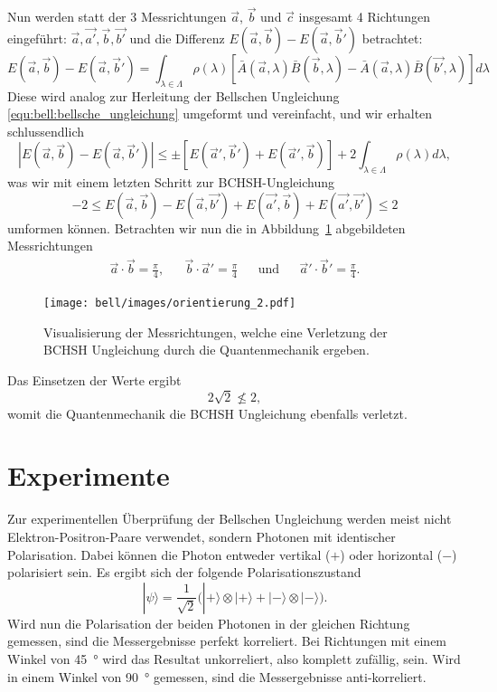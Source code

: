 \begin{refsection}
Nun werden statt der 3 Messrichtungen $\vec{a}$, $\vec{b}$ und $\vec{c}$
insgesamt 4 Richtungen eingef\"uhrt: $\vec{a}, \vec{a'}, \vec{b}, \vec{b'}$
und die Differenz $E(\vec{a},\vec{b}) - E(\vec{a},\vec{b}')$ betrachtet:
\begin{equation}
    E(\vec{a},\vec{b}) - E(\vec{a},\vec{b}') = 
    \int_{\lambda\in\Lambda} \rho(\lambda) \left[
        \bar{A}(\vec{a},\lambda)\bar{B}(\vec{b},\lambda) -
        \bar{A}(\vec{a},\lambda)\bar{B}(\vec{b'},\lambda)
    \right] d\lambda
\end{equation}
Diese wird analog zur Herleitung der Bellschen Ungleichung 
\eqref{equ:bell:bellsche_ungleichung} umgeformt und vereinfacht, und wir
erhalten schlussendlich
\[
    \left| E(\vec{a},\vec{b}) - E(\vec{a},\vec{b}') \right| \leq \pm \left[
        E(\vec{a}',\vec{b}') + E(\vec{a}',\vec{b})
    \right]
    + 2 \int_{\lambda\in\Lambda} \rho(\lambda) d\lambda,
\]
was wir mit einem letzten Schritt zur BCHSH-Ungleichung
\begin{equation}\label{equ:bell:bchsh-ungleichung}
    -2 \leq 
    E(\vec{a},\vec{b}) - E(\vec{a},\vec{b'}) + E(\vec{a'},\vec{b}) + E(\vec{a'},\vec{b'})
    \leq 2
\end{equation}
umformen k\"onnen.
Betrachten wir nun die in Abbildung~\ref{fig:bell:orientierung_2}
abgebildeten Messrichtungen
\begin{align*}
    \vec{a}\cdot\vec{b} = \frac{\pi}{4}, && 
    \vec{b}\cdot\vec{a}' = \frac{\pi}{4} && 
    \text{und} &&
    \vec{a}'\cdot\vec{b}' = \frac{\pi}{4}.
\end{align*}
\begin{figure}
    \centering
    \texttt{[image: bell/images/orientierung\_2.pdf]}
    \caption{Visualisierung der Messrichtungen, welche eine Verletzung der
    BCHSH Ungleichung durch die Quantenmechanik ergeben.}
    \label{fig:bell:orientierung_2}
\end{figure}
Das Einsetzen der Werte ergibt
\[
    2 \sqrt{2} \nleqslant 2,
\]
womit die Quantenmechanik die BCHSH Ungleichung ebenfalls verletzt.

\section{Experimente}
Zur experimentellen \"Uberpr\"ufung der Bellschen Ungleichung werden meist
nicht Elektron-Positron-Paare verwendet, sondern
Photonen mit identischer Polarisation.
Dabei k\"onnen die Photon entweder vertikal ($+$) oder horizontal
($-$) polarisiert sein. 
Es ergibt sich der folgende Polarisationszustand
\begin{equation}\label{equ:bell:photonstate}
    |\psi\rangle = \frac{1}{\sqrt{2}} \Big(
        |{+}\rangle \otimes |{+}\rangle + |{-}\rangle \otimes |{-}\rangle
    \Big).
\end{equation}
Wird nun die Polarisation der beiden Photonen in der gleichen Richtung 
gemessen, sind die Messergebnisse perfekt korreliert.
Bei Richtungen mit einem Winkel von \SI{45}{\degree} wird das Resultat
unkorreliert, also komplett zuf\"allig, sein.
Wird in einem Winkel von \SI{90}{\degree} gemessen, sind die Messergebnisse
anti-korreliert.


\end{refsection}

